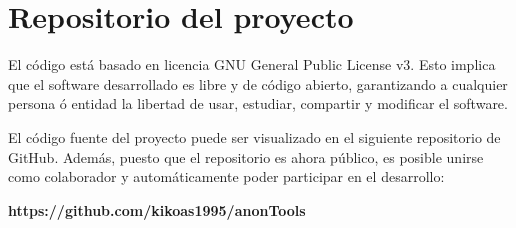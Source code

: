 \chapter{Repositorio del proyecto}
\label{Anexo:repositorio}

El código está basado en licencia GNU General Public License v3. Esto implica que el software desarrollado es libre y de código abierto, garantizando a cualquier persona ó entidad la libertad de usar, estudiar, compartir y modificar el software. 

El código fuente del proyecto puede ser visualizado en el siguiente repositorio de GitHub. Además, puesto que el repositorio es ahora público, es posible unirse como colaborador y automáticamente poder participar en el desarrollo:

\textbf{https://github.com/kikoas1995/anonTools
	}
\newpage \thispagestyle{empty} %